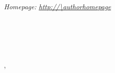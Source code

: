 \def\firstname{\pdfsurname}
\def\familyname{\pdfname}

\renewcommand{\ttdefault}{pcr}

\usepackage{url}
\ifpdf
  \usepackage[pdftex,pdfborder=0,breaklinks,baseurl=http://,pdfpagemode=None,pdfstartview=XYZ,pdfstartpage=1]{hyperref}
  \hypersetup{
    pdfauthor   = Matthias Guenther,
    pdftitle    = Anschreiben Matthias Guenther,
    pdfsubject  = Anschreiben Matthias Guenther,
    pdfcreator  = \LaTeX,
    pdfproducer = pdfTeX 3.1415926-1.40.10-2.2}
\else
  \usepackage[dvips]{hyperref}
\fi



\sffamily   %
\hfill%
\begin{minipage}[t]{.6\textwidth}
\raggedleft%
{\bfseries \pdfauthor}\\[.35ex]
\small\itshape%
\pdfauthorstreet\\
\pdfauthorplz \pdfauthorcity\\[.35ex]
\Telefon~\pdfauthorphone\\
\Letter~\href{mailto:\pdfauthoremail}{\pdfauthoremail}\\
Homepage: \url{http://\authorhomepage}
\end{minipage}\\[1em]
%
\begin{minipage}[t]{.4\textwidth}
\raggedright%
{\bfseries \receivername}\\[.35ex]
\small\itshape%
\receiverstreet\\
\recievercity
\end{minipage}
\hfill %
\begin{minipage}[t]{.4\textwidth}
\raggedleft %
\pdfauthorcity, \createdate
\end{minipage}\\[1.5em]
\raggedright
\nopagebreak


